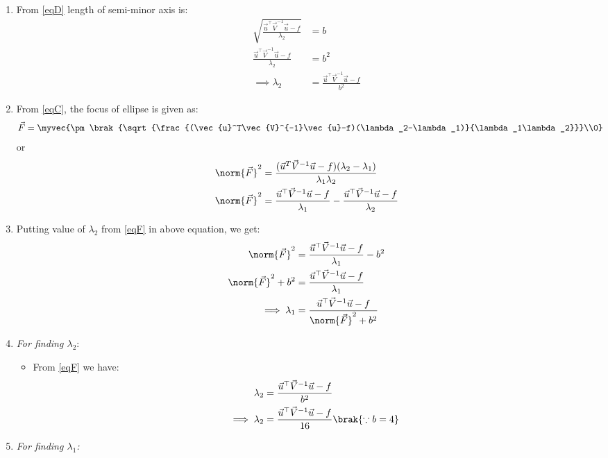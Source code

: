 \documentclass[journal,12pt,twocolumn]{IEEEtran}
\begin{document}
\begin{enumerate}
\item From \eqref{eqD} length of semi-minor axis is:
\begin{align}
 \sqrt{\frac{\vec{u}^{\top}\vec{V}^{-1}\vec{u}-f}{\lambda_2}} &= b
\\
 \frac{\vec{u}^{\top}\vec{V}^{-1}\vec{u}-f}{\lambda_2} &= b^2
\\
\implies \lambda_2&=\frac{\vec{u}^{\top}\vec{V}^{-1}\vec{u}-f}{b^2}\label{eqF} 
\end{align}
\item From \eqref{eqC}, the focus of ellipse is given as:
\begin{align}
 \vec{F} &= \myvec{\pm \brak{\sqrt{\frac{(\vec{u}^T\vec{V}^{-1}\vec{u}-f)(\lambda_2-\lambda_1)}{\lambda_1\lambda_2}}}\\0}
 \end{align}
 or
 \begin{align}
\norm{\vec{F}}^2 &= \frac{(\vec{u}^T\vec{V}^{-1}\vec{u}-f)(\lambda_2-\lambda_1)}{\lambda_1\lambda_2}
 \\
\norm{\vec{F}}^2 &= \frac{\vec{u}^{\top}\vec{V}^{-1}\vec{u}-f}{\lambda_1}-\frac{\vec{u}^{\top}\vec{V}^{-1}\vec{u}-f}{\lambda_2} \label{eqE}
 \end{align}
\item Putting value of $\lambda_2$ from \eqref{eqF} in above equation, we get:
\begin{align}
    \norm{\vec{F}}^2&= \frac{\vec{u}^{\top}\vec{V}^{-1}\vec{u}-f}{\lambda_1}-b^2
    \\
    \norm{\vec{F}}^2+b^2 &= \frac{\vec{u}^{\top}\vec{V}^{-1}\vec{u}-f}{\lambda_1}
    \\
 \implies \lambda_1 &= \frac{\vec{u}^{\top}\vec{V}^{-1}\vec{u}-f}{\norm{\vec{F}}^2+b^2}\label{eq1}
    \end{align}
    \item \textit{For finding $\lambda_2$}:
\begin{itemize}
    \item From \eqref{eqF} we have:
\begin{align}
\lambda_2&=\frac{\vec{u}^{\top}\vec{V}^{-1}\vec{u}-f}{b^2}
\\
\implies \lambda_2&=\frac{\vec{u}^{\top}\vec{V}^{-1}\vec{u}-f}{16} \brak{\because b=4} \label{eqH}
\end{align}
\end{itemize}
\item \textit{For finding $\lambda_1$:}
\begin{itemize}

\end{itemize}
\end{enumerate}
\end{document}
